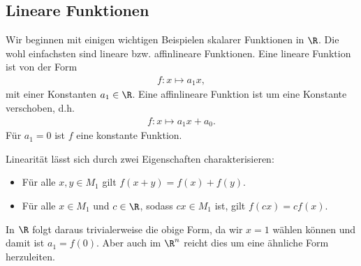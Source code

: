 \documentclass[letterpaper,10pt,english]{jupyterBook}
\begin{document}
\subsection{Lineare Funktionen}
\label{\detokenize{vorkurs/funktionen:lineare-funktionen}}
Wir beginnen mit einigen wichtigen Beispielen skalarer Funktionen in \(\R\). Die wohl einfachsten sind lineare bzw. affin\sphinxhyphen{}lineare Funktionen. Eine lineare Funktion ist von der Form
\begin{equation*}
\begin{split} f:x \mapsto a_1 x, \end{split}
\end{equation*}
mit einer Konstanten \(a_1 \in \R\). Eine affin\sphinxhyphen{}lineare Funktion ist um eine Konstante verschoben, d.h.
\begin{equation*}
\begin{split} f:x\mapsto a_1 x + a_0. \end{split}
\end{equation*}
Für \(a_1 =0\) ist \(f\) eine konstante Funktion.

Linearität lässt sich durch zwei Eigenschaften charakterisieren:
\begin{itemize}
\item {} 
Für alle \(x,y \in M_1\) gilt \(f(x+y)=f(x) + f(y) \).

\item {} 
Für alle \(x \in M_1\) und \(c \in \R\), sodass \(cx \in M_1\) ist, gilt \(f(cx) = c f(x)\).

\end{itemize}

In \(\R\) folgt daraus trivialerweise die obige Form, da wir \(x=1\) wählen können und damit ist \(a_1 = f(0)\). Aber auch im \(\R^n\) reicht dies um eine ähnliche Form herzuleiten.
\end{document}

